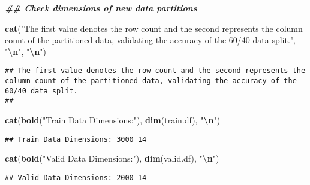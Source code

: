 \documentclass[
]{article}
\newenvironment{Shaded}{\begin{snugshade}}{\end{snugshade}}
\newcommand{\DocumentationTok}[1]{\textcolor[rgb]{0.56,0.35,0.01}{\textbf{\textit{#1}}}}
\newcommand{\FunctionTok}[1]{\textcolor[rgb]{0.13,0.29,0.53}{\textbf{#1}}}
\newcommand{\NormalTok}[1]{#1}
\newcommand{\SpecialCharTok}[1]{\textcolor[rgb]{0.81,0.36,0.00}{\textbf{#1}}}
\newcommand{\StringTok}[1]{\textcolor[rgb]{0.31,0.60,0.02}{#1}}
\begin{document}
\begin{Shaded}
\begin{Highlighting}[]
\DocumentationTok{\#\# Check dimensions of new data partitions}

\FunctionTok{cat}\NormalTok{(}\StringTok{"The first value denotes the row count and the second represents the column count of the partitioned data, validating the accuracy of the 60/40 data split."}\NormalTok{, }\StringTok{"}\SpecialCharTok{\textbackslash{}n}\StringTok{"}\NormalTok{, }\StringTok{"}\SpecialCharTok{\textbackslash{}n}\StringTok{"}\NormalTok{)}
\end{Highlighting}
\end{Shaded}

\begin{verbatim}
## The first value denotes the row count and the second represents the column count of the partitioned data, validating the accuracy of the 60/40 data split. 
## 
\end{verbatim}

\begin{Shaded}
\begin{Highlighting}[]
\FunctionTok{cat}\NormalTok{(}\FunctionTok{bold}\NormalTok{(}\StringTok{"Train Data Dimensions:"}\NormalTok{), }\FunctionTok{dim}\NormalTok{(train.df), }\StringTok{"}\SpecialCharTok{\textbackslash{}n}\StringTok{"}\NormalTok{)}
\end{Highlighting}
\end{Shaded}

\begin{verbatim}
## Train Data Dimensions: 3000 14
\end{verbatim}

\begin{Shaded}
\begin{Highlighting}[]
\FunctionTok{cat}\NormalTok{(}\FunctionTok{bold}\NormalTok{(}\StringTok{"Valid Data Dimensions:"}\NormalTok{), }\FunctionTok{dim}\NormalTok{(valid.df), }\StringTok{"}\SpecialCharTok{\textbackslash{}n}\StringTok{"}\NormalTok{)}
\end{Highlighting}
\end{Shaded}

\begin{verbatim}
## Valid Data Dimensions: 2000 14
\end{verbatim}
\end{document}
